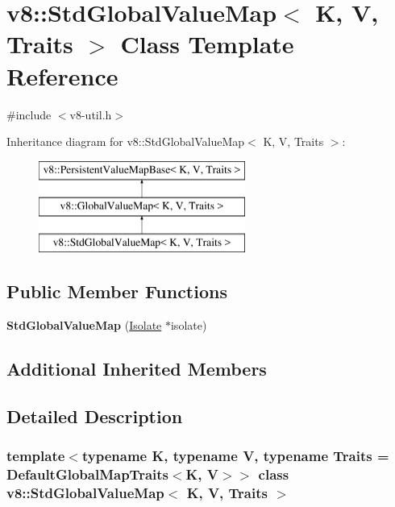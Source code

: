 \hypertarget{classv8_1_1StdGlobalValueMap}{}\section{v8\+:\+:Std\+Global\+Value\+Map$<$ K, V, Traits $>$ Class Template Reference}
\label{classv8_1_1StdGlobalValueMap}


{\ttfamily \#include $<$v8-\/util.\+h$>$}

Inheritance diagram for v8\+:\+:Std\+Global\+Value\+Map$<$ K, V, Traits $>$\+:\begin{figure}[H]
\begin{center}
\leavevmode
\includegraphics[height=3.000000cm]{classv8_1_1StdGlobalValueMap}
\end{center}
\end{figure}
\subsection*{Public Member Functions}
\begin{DoxyCompactItemize}
\item 
\mbox{\label{classv8_1_1StdGlobalValueMap_af1025915a269b8b37af93ffc2ad5c3b1}} 
{\bfseries Std\+Global\+Value\+Map} (\mbox{\hyperlink{classv8_1_1Isolate}{Isolate}} $\ast$isolate)
\end{DoxyCompactItemize}
\subsection*{Additional Inherited Members}


\subsection{Detailed Description}
\subsubsection*{template$<$typename K, typename V, typename Traits = Default\+Global\+Map\+Traits$<$\+K, V$>$$>$\newline
class v8\+::\+Std\+Global\+Value\+Map$<$ K, V, Traits $>$}

